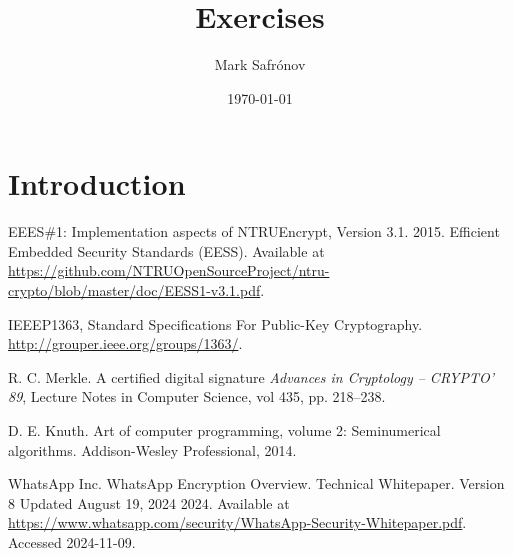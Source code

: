 \documentclass[11pt, a4paper]{report}
\title{Exercises}
\author{Mark Safrónov}
\date{\today}
\begin{document}


\tableofcontents

\section{Introduction}








%

\begin{thebibliography}{11}

EEES\#1: Implementation aspects of NTRUEncrypt, Version 3.1.
2015. Efficient Embedded Security Standards (EESS). 
Available at
\url{https://github.com/NTRUOpenSourceProject/ntru-crypto/blob/master/doc/EESS1-v3.1.pdf}.

IEEEP1363, Standard Specifications For Public-Key Cryptography. 
\url{http://grouper.ieee.org/groups/1363/}.

R. C. Merkle.
A certified digital signature
\emph{Advances in Cryptology -- CRYPTO’ 89}, Lecture Notes in Computer Science, vol 435, pp. 218--238.
	
D. E. Knuth. 
Art of computer programming, volume 2: Seminumerical algorithms. 
Addison-Wesley Professional, 2014.

WhatsApp Inc.
WhatsApp Encryption Overview. Technical Whitepaper.
Version 8 Updated August 19, 2024
2024.
Available at \url{https://www.whatsapp.com/security/WhatsApp-Security-Whitepaper.pdf}.
Accessed 2024-11-09.
\end{thebibliography}
\end{document}

